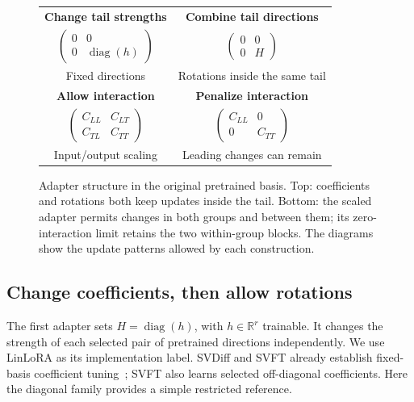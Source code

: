 \documentclass{article}
\newcommand{\diag}{\operatorname{diag}}
\begin{document}
\begin{figure}[t]
\centering
\begin{tabular}{cc}
\textbf{Change tail strengths} & \textbf{Combine tail directions}\\[2pt]
$\begin{pmatrix}0&0\\0&\diag(h)\end{pmatrix}$ &
$\begin{pmatrix}0&0\\0&H\end{pmatrix}$\\[5pt]
Fixed directions & Rotations inside the same tail\\[9pt]
\textbf{Allow interaction} & \textbf{Penalize interaction}\\[2pt]
$\begin{pmatrix}C_{LL}&C_{LT}\\C_{TL}&C_{TT}\end{pmatrix}$ &
$\begin{pmatrix}C_{LL}&0\\0&C_{TT}\end{pmatrix}$\\[5pt]
Input/output scaling & Leading changes can remain
\end{tabular}
\caption{Adapter structure in the original pretrained basis. Top: coefficients and rotations both keep updates inside the tail. Bottom: the scaled adapter permits changes in both groups and between them; its zero-interaction limit retains the two within-group blocks. The diagrams show the update patterns allowed by each construction.}
\label{fig:blockschematic}
\end{figure}

\subsection{Change coefficients, then allow rotations}
The first adapter sets $H=\diag(h)$, with $h\in\mathbb R^r$ trainable. It changes the strength of each selected pair of pretrained directions independently. We use LinLoRA as its implementation label. SVDiff and SVFT already establish fixed-basis coefficient tuning~\citep{han2023svdiff,lingam2024svft}; SVFT also learns selected off-diagonal coefficients. Here the diagonal family provides a simple restricted reference.
\end{document}
